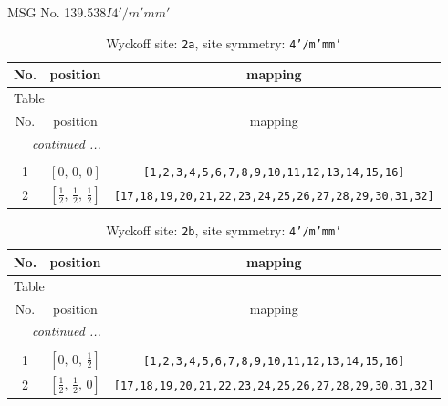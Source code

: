 \documentclass[fleqn,8pt]{jsarticle}
\begin{document}
\setcounter{MaxMatrixCols}{32}

\renewcommand{\tablename}{Table~}
\renewcommand{\figurename}{Figure~}
\begin{center}
\LARGE
MSG No. 139.538\quad$I4'/m'mm'$
\end{center}
\renewcommand{\arraystretch}{1.2}
\begin{longtable}{ccc}
\caption{Wyckoff site: {\tt 2a}, site symmetry: {\tt 4'/m'mm'}}
 \\
 \hline \hline
No. & position & mapping \\ \hline \endfirsthead

\multicolumn{2}{l}{\tablename\ \thetable{}} \\
 \hline \hline
No. & position & mapping \\ \hline \endhead

 \hline \hline
\multicolumn{2}{r}{\footnotesize\it continued ...} \\ \endfoot

 \hline \hline
\multicolumn{2}{r}{} \\ \endlastfoot

1 & $\left[ 0,\, 0,\, 0 \right]$ & {\tt [1,2,3,4,5,6,7,8,9,10,11,12,13,14,15,16]} \\ \hline
2 & $\left[ \frac{1}{2},\, \frac{1}{2},\, \frac{1}{2} \right]$ & {\tt [17,18,19,20,21,22,23,24,25,26,27,28,29,30,31,32]} \\
\end{longtable}
\renewcommand{\arraystretch}{1.2}
\begin{longtable}{ccc}
\caption{Wyckoff site: {\tt 2b}, site symmetry: {\tt 4'/m'mm'}}
 \\
 \hline \hline
No. & position & mapping \\ \hline \endfirsthead

\multicolumn{2}{l}{\tablename\ \thetable{}} \\
 \hline \hline
No. & position & mapping \\ \hline \endhead

 \hline \hline
\multicolumn{2}{r}{\footnotesize\it continued ...} \\ \endfoot

 \hline \hline
\multicolumn{2}{r}{} \\ \endlastfoot

1 & $\left[ 0,\, 0,\, \frac{1}{2} \right]$ & {\tt [1,2,3,4,5,6,7,8,9,10,11,12,13,14,15,16]} \\ \hline
2 & $\left[ \frac{1}{2},\, \frac{1}{2},\, 0 \right]$ & {\tt [17,18,19,20,21,22,23,24,25,26,27,28,29,30,31,32]} \\
\end{longtable}
\end{document}

